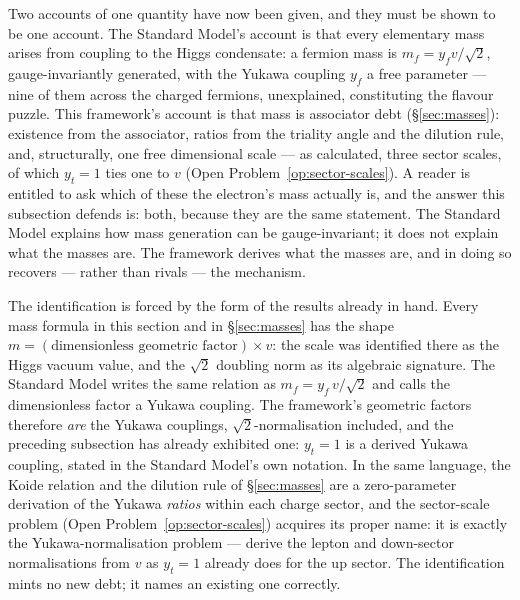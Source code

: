 Two accounts of one quantity have now been given, and they must be shown to be one account. The
Standard Model's account is that every elementary mass arises from coupling to the Higgs
condensate: a fermion mass is $m_f = y_f v/\sqrt2$, gauge-invariantly generated, with the Yukawa
coupling $y_f$ a free parameter --- nine of them across the charged fermions, unexplained,
constituting the flavour puzzle. This framework's account is that mass is associator debt
(\S\ref{sec:masses}): existence from the associator, ratios from the triality angle and the
dilution rule, and, structurally, one free dimensional scale --- as calculated, three sector
scales, of which $y_t = 1$ ties one to $v$ (Open Problem~\ref{op:sector-scales}). A reader is
entitled to ask which of these the electron's mass actually is, and the answer this subsection
defends is: both, because they are the same statement. The Standard Model explains how mass
generation can be gauge-invariant; it does not explain what the masses are. The framework
derives what the masses are, and in doing so recovers --- rather than rivals --- the mechanism.

The identification is forced by the form of the results already in hand. Every mass formula in this
section and in \S\ref{sec:masses} has the shape $m = (\text{dimensionless geometric factor}) \times
v$: the scale was identified there as the Higgs vacuum value, and the $\sqrt2$ doubling norm as its
algebraic signature. The Standard Model writes the same relation as $m_f = y_f\,v/\sqrt2$ and calls
the dimensionless factor a Yukawa coupling. The framework's geometric factors therefore \emph{are}
the Yukawa couplings, $\sqrt2$-normalisation included, and the preceding subsection has already
exhibited one: $y_t = 1$ is a derived Yukawa coupling, stated in the Standard Model's own notation.
In the same language, the Koide relation and the dilution rule of \S\ref{sec:masses} are a
zero-parameter derivation of the Yukawa \emph{ratios} within each charge sector, and the sector-scale
problem (Open Problem~\ref{op:sector-scales}) acquires its proper name: it is exactly the
Yukawa-normalisation problem --- derive the lepton and down-sector normalisations from $v$ as
$y_t = 1$ already does for the up sector. The identification mints no new debt; it names an existing
one correctly.

